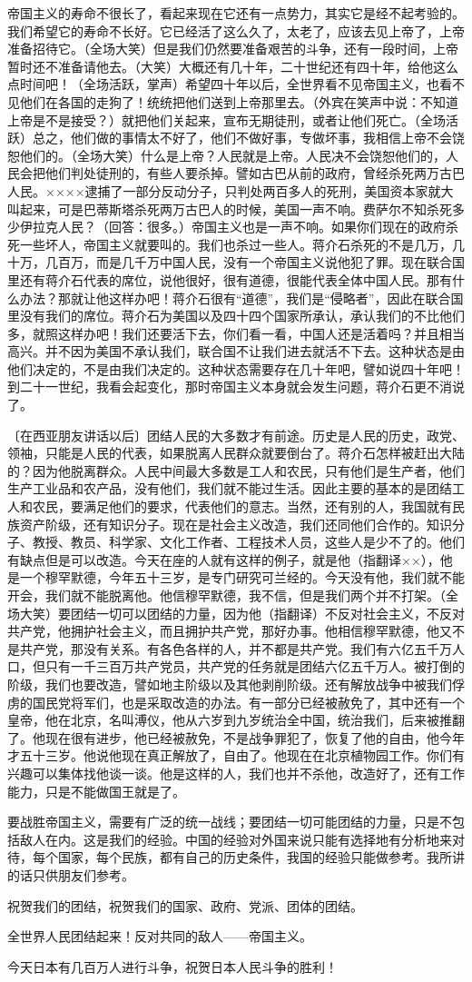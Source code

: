 帝国主义的寿命不很长了，看起来现在它还有一点势力，其实它是经不起考验的。我们希望它的寿命不长好。它已经活了这么久了，太老了，应该去见上帝了，上帝准备招待它。（全场大笑）但是我们仍然要准备艰苦的斗争，还有一段时间，上帝暂时还不准备请他去。（大笑）大概还有几十年，二十世纪还有四十年，给他这么点时间吧！（全场活跃，掌声）希望四十年以后，全世界看不见帝国主义，也看不见他们在各国的走狗了！统统把他们送到上帝那里去。（外宾在笑声中说：不知道上帝是不是接受？）就把他们关起来，宣布无期徒刑，或者让他们死亡。（全场活跃）总之，他们做的事情太不好了，他们不做好事，专做坏事，我相信上帝不会饶恕他们的。（全场大笑）什么是上帝？人民就是上帝。人民决不会饶恕他们的，人民会把他们判处徒刑的，有些人要杀掉。譬如古巴从前的政府，曾经杀死两万古巴人民。××××逮捕了一部分反动分子，只判处两百多人的死刑，美国资本家就大叫起来，可是巴蒂斯塔杀死两万古巴人的时候，美国一声不响。费萨尔不知杀死多少伊拉克人民？（回答：很多。）帝国主义也是一声不响。如果你们现在的政府杀死一些坏人，帝国主义就要叫的。我们也杀过一些人。蒋介石杀死的不是几万，几十万，几百万，而是几千万中国人民，没有一个帝国主义说他犯了罪。现在联合国里还有蒋介石代表的席位，说他很好，很有道德，很能代表全体中国人民。那有什么办法？那就让他这样办吧！蒋介石很有“道德”，我们是“侵略者”，因此在联合国里没有我们的席位。蒋介石为美国以及四十四个国家所承认，承认我们的不比他们多，就照这样办吧！我们还要活下去，你们看一看，中国人还是活着吗？并且相当高兴。并不因为美国不承认我们，联合国不让我们进去就活不下去。这种状态是由他们决定的，不是由我们决定的。这种状态需要存在几十年吧，譬如说四十年吧！到二十一世纪，我看会起变化，那时帝国主义本身就会发生问题，蒋介石更不消说了。

〔在西亚朋友讲话以后〕团结人民的大多数才有前途。历史是人民的历史，政党、领袖，只能是人民的代表，如果脱离人民群众就要倒台了。蒋介石怎样被赶出大陆的？因为他脱离群众。人民中间最大多数是工人和农民，只有他们是生产者，他们生产工业品和农产品，没有他们，我们就不能过生活。因此主要的基本的是团结工人和农民，要满足他们的要求，代表他们的意志。当然，还有别的人，我国就有民族资产阶级，还有知识分子。现在是社会主义改造，我们还同他们合作的。知识分子、教授、教员、科学家、文化工作者、工程技术人员，这些人是少不了的。他们有缺点但是可以改造。今天在座的人就有这样的例子，就是他（指翻译××），他是一个穆罕默德，今年五十三岁，是专门研究可兰经的。今天没有他，我们就不能开会，我们就不能脱离他。他信穆罕默德，我不信，但是我们两个并不打架。（全场大笑）要团结一切可以团结的力量，因为他（指翻译）不反对社会主义，不反对共产党，他拥护社会主义，而且拥护共产党，那好办事。他相信穆罕默德，他又不是共产党，那没有关系。有各色各样的人，并不都是共产党。我们有六亿五千万人口，但只有一千三百万共产党员，共产党的任务就是团结六亿五千万人。被打倒的阶级，我们也要改造，譬如地主阶级以及其他剥削阶级。还有解放战争中被我们俘虏的国民党将军们，也是采取改造的办法。有一部分已经被赦免了，其中还有一个皇帝，他在北京，名叫溥仪，他从六岁到九岁统治全中国，统治我们，后来被推翻了。他现在很有进步，他已经被赦免，不是战争罪犯了，恢复了他的自由，他今年才五十三岁。他说他现在真正解放了，自由了。他现在在北京植物园工作。你们有兴趣可以集体找他谈一谈。他是这样的人，我们也并不杀他，改造好了，还有工作能力，只是不能做国王就是了。

要战胜帝国主义，需要有广泛的统一战线；要团结一切可能团结的力量，只是不包括敌人在内。这是我们的经验。中国的经验对外国来说只能有选择地有分析地来对待，每个国家，每个民族，都有自己的历史条件，我国的经验只能做参考。我所讲的话只供朋友们参考。

祝贺我们的团结，祝贺我们的国家、政府、党派、团体的团结。

全世界人民团结起来！反对共同的敌人——帝国主义。

今天日本有几百万人进行斗争，祝贺日本人民斗争的胜利！


